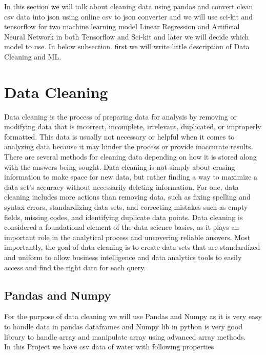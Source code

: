 In this section we will talk about cleaning data using pandas and convert clean csv data into json using online csv to json converter and we will use sci-kit and tensorflow for two machine learning model Linear Regression and Artificial Neural Network in both Tensorflow and Sci-kit and later we will decide which model to use. In below subsection. first we will write little description of Data Cleaning and ML.\\

\section{Data Cleaning}

Data cleaning is the process of preparing data for analysis by removing or modifying data that is incorrect, incomplete, irrelevant, duplicated, or improperly formatted. This data is usually not necessary or helpful when it comes to analyzing data because it may hinder the process or provide inaccurate results. There are several methods for cleaning data depending on how it is stored along with the answers being sought. Data cleaning is not simply about erasing information to make space for new data, but rather finding a way to maximize a data set’s accuracy without necessarily deleting information. For one, data cleaning includes more actions than removing data, such as fixing spelling and syntax errors, standardizing data sets, and correcting mistakes such as empty fields, missing codes, and identifying duplicate data points. Data cleaning is considered a foundational element of the data science basics, as it plays an important role in the analytical process and uncovering reliable answers. Most importantly, the goal of data cleaning is to create data sets that are standardized and uniform to allow business intelligence and data analytics tools to easily access and find the right data for each query.

\subsection{Pandas and Numpy}

For the purpose of data cleaning we will use Pandas and Numpy as it is very easy to handle data in pandas dataframes and Numpy lib in python is very good library to handle array and manipulate array using advanced array methods.\\

In this Project we have csv data of water with following properties\\

